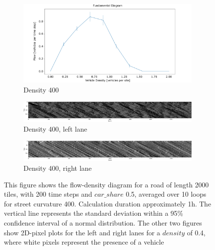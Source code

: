 \begin{figure}
     \centering
    \begin{subfigure}[b]{1.0\textwidth}
        \centering
        \includegraphics[width=\textwidth]{images/flow_density401_half_bike.png.png}
        \caption{Density 400}
    \end{subfigure}

    \begin{subfigure}[b]{1.0\textwidth}
        \centering
        \includegraphics[width=\textwidth]{images/2D_401_half_bike_left.png}
        \caption{Density 400, left lane}
    \end{subfigure}

    \begin{subfigure}[b]{1.0\textwidth}
        \centering
        \includegraphics[width=\textwidth]{images/2D_401_half_bike_right.png}
        \caption{Density 400, right lane}
    \end{subfigure}
    \caption{This figure shows the flow-density diagram for a road of length 2000 tiles, with 200 time steps and $car\_share$ 0.5, averaged over 10 loops for street curvature 400. Calculation duration approximately 1h. The vertical line represents the standard deviation within a 95\% confidence interval of a normal distribution. The other two figures show 2D-pixel plots for the left and right lanes for a $density$ of 0.4, where white pixels represent the presence of a vehicle}
    \label{fig:flow_density401_half_bike}
\end{figure}

